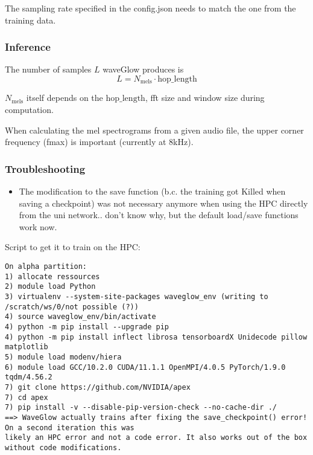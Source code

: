 \documentclass{article}
\begin{document}
The sampling rate specified in the config.json needs to match the one from the training data.

\subsubsection*{Inference}
The number of samples $L$ waveGlow produces is 
\begin{equation}
L = N_{\mathrm{mels}}\cdot \mathrm{hop\_length}
\end{equation}

$N_{\mathrm{mels}}$ itself depends on the $\mathrm{hop\_length}$, fft size and window size during computation.

When calculating the mel spectrograms from a given audio file, the upper corner frequency (fmax) is important (currently at 8kHz).

\subsubsection*{Troubleshooting}

\begin{itemize}
\item The modification to the save function (b.c. the training got Killed when saving a checkpoint) was not necessary anymore when using the HPC directly from the uni network.. don't know why, but the default load/save functions work now.
\end{itemize}

Script to get it to train on the HPC:
\begin{verbatim}
On alpha partition:
1) allocate ressources
2) module load Python
3) virtualenv --system-site-packages waveglow_env (writing to /scratch/ws/0/not possible (?))
4) source waveglow_env/bin/activate
4) python -m pip install --upgrade pip
4) python -m pip install inflect librosa tensorboardX Unidecode pillow matplotlib
5) module load modenv/hiera
6) module load GCC/10.2.0 CUDA/11.1.1 OpenMPI/4.0.5 PyTorch/1.9.0 tqdm/4.56.2
7) git clone https://github.com/NVIDIA/apex
7) cd apex
7) pip install -v --disable-pip-version-check --no-cache-dir ./
==> WaveGlow actually trains after fixing the save_checkpoint() error! On a second iteration this was 
likely an HPC error and not a code error. It also works out of the box without code modifications.
\end{verbatim}



\end{document}
